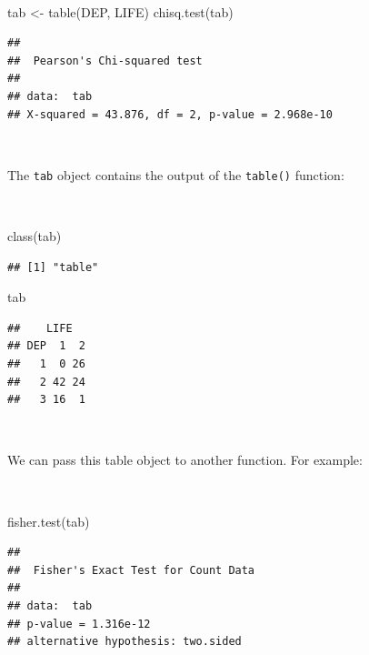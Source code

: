 \documentclass[
  12pt,
]{book}
\newenvironment{Shaded}{\begin{snugshade}}{\end{snugshade}}
\newcommand{\FunctionTok}[1]{\textcolor[rgb]{0.00,0.00,0.00}{#1}}
\newcommand{\NormalTok}[1]{#1}
\newcommand{\OtherTok}[1]{\textcolor[rgb]{0.56,0.35,0.01}{#1}}
\begin{document}
~

\begin{Shaded}
\begin{Highlighting}[]
\NormalTok{tab }\OtherTok{\textless{}{-}} \FunctionTok{table}\NormalTok{(DEP, LIFE)}
\FunctionTok{chisq.test}\NormalTok{(tab)}
\end{Highlighting}
\end{Shaded}

\begin{verbatim}
## 
##  Pearson's Chi-squared test
## 
## data:  tab
## X-squared = 43.876, df = 2, p-value = 2.968e-10
\end{verbatim}

~

The \texttt{tab} object contains the output of the \texttt{table()} function:

~

\begin{Shaded}
\begin{Highlighting}[]
\FunctionTok{class}\NormalTok{(tab)}
\end{Highlighting}
\end{Shaded}

\begin{verbatim}
## [1] "table"
\end{verbatim}

\begin{Shaded}
\begin{Highlighting}[]
\NormalTok{tab}
\end{Highlighting}
\end{Shaded}

\begin{verbatim}
##    LIFE
## DEP  1  2
##   1  0 26
##   2 42 24
##   3 16  1
\end{verbatim}

~

We can pass this table object to another function. For example:

~

\begin{Shaded}
\begin{Highlighting}[]
\FunctionTok{fisher.test}\NormalTok{(tab)}
\end{Highlighting}
\end{Shaded}

\begin{verbatim}
## 
##  Fisher's Exact Test for Count Data
## 
## data:  tab
## p-value = 1.316e-12
## alternative hypothesis: two.sided
\end{verbatim}
\end{document}

